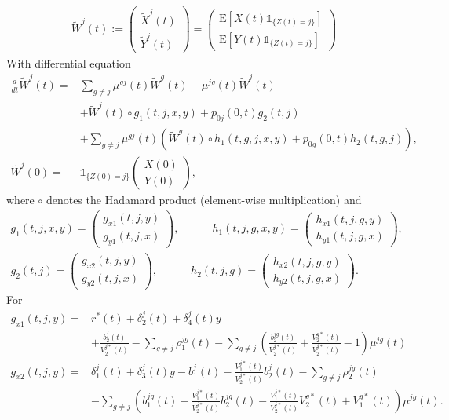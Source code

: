 \documentclass[12pt]{article}
\newcommand{\E}{\text{E}}
\newcommand{\indic}[1]{\mathds{1}_{ \{ #1 \} }}
\begin{document}
\begin{align*}
\tilde{W}^j(t):=
\begin{pmatrix}
\tilde{X}^j(t) \\
\tilde{Y}^j(t)
\end{pmatrix}
=
\begin{pmatrix}
\E[ X(t) \indic{Z(t)=j}] \\
\E[ Y(t) \indic{Z(t)=j}]
\end{pmatrix}
\end{align*}
With differential equation
\begin{align*}
\frac{d}{dt}\tilde{W}^j(t)=&
\sum_{g\neq j} \mu^{gj}(t) \tilde{W}^g(t) - \mu^{jg}(t) \tilde{W}^j(t)
\\
&+ \tilde{W}^j(t) \circ g_1(t,j,x,y)+p_{0j}(0,t) g_2(t,j)
\\
&+ \sum_{g \neq j} \mu^{gj}(t) \left( \tilde{W}^g(t) \circ h_1(t,g,j,x,y)+ p_{0g}(0,t) h_2(t,g,j) \right),
\\
\tilde{W}^j(0)=&\indic{Z(0)=j} \begin{pmatrix}
X(0)\\
Y(0)
\end{pmatrix},
\end{align*}
where $\circ$ denotes the Hadamard product (element-wise multiplication) and
\begin{gather*}
g_1(t,j,x,y)=\begin{pmatrix}
g_{x1}(t,j,y) \\
g_{y1}(t,j,x)
\end{pmatrix},
\qquad 
\quad
h_1(t,j,g,x,y)=\begin{pmatrix}
h_{x1}(t,j,g,y) \\
h_{y1}(t,j,g,x)
\end{pmatrix},
\\
g_2(t,j)=\begin{pmatrix}
g_{x2}(t,j,y) \\
g_{y2}(t,j,x)
\end{pmatrix},
\qquad 
\quad
h_2(t,j,g)=\begin{pmatrix}
h_{x2}(t,j,g,y) \\
h_{y2}(t,j,g,x)
\end{pmatrix}.
\end{gather*}
For 
\begin{align*}
g_{x1}(t,j,y)=&r^*(t)  +\delta_2^j(t)+\delta_4^j(t)y\\
&+\frac{b^j_2(t)}{V_2^{j*}(t)}
-\sum_{g \neq j} \rho_1^{jg}(t)
-\sum_{g \neq j} \left(\frac{b^{jg}_2(t)}{V_2^{j*}(t)} + \frac{V^{g*}_2(t)}{V^{j*}_2(t)}-1 \right) \mu^{jg}(t)
\\
g_{x2}(t,j,y)=& \delta_1^j(t)
+\delta_3^j(t)y
-b_1^j(t)
-\frac{V_1^{j*}(t)}{V_2^{j*}(t)}b^j_2(t)
-\sum_{g \neq j} \rho_2^{jg}(t)
\\
&-\sum_{g \neq j} \left( b_1^{jg}(t)-\frac{V_1^{j*}(t)}{V_2^{j*}(t)}b^{jg}_2(t) -\frac{V^{j*}_1(t)}{V^{j*}_2(t)}V^{g*}_2(t)+V^{g*}_1(t) \right) \mu^{jg}(t).
\end{align*}
\end{document}
